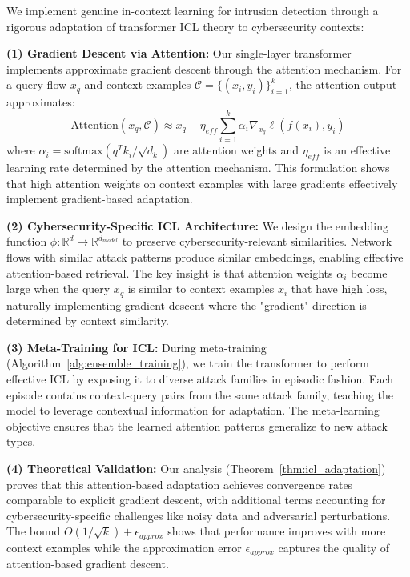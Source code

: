 \documentclass[journal]{IEEEtran}
\begin{document}
We implement genuine in-context learning for intrusion detection through a rigorous adaptation of transformer ICL theory to cybersecurity contexts:

\textbf{(1) Gradient Descent via Attention:} Our single-layer transformer implements approximate gradient descent through the attention mechanism. For a query flow $x_q$ and context examples $\mathcal{C} = \{(x_i, y_i)\}_{i=1}^k$, the attention output approximates:
\begin{equation}
\text{Attention}(x_q, \mathcal{C}) \approx x_q - \eta_{eff} \sum_{i=1}^k \alpha_i \nabla_{x_q} \ell(f(x_i), y_i)
\end{equation}
where $\alpha_i = \text{softmax}(q^T k_i / \sqrt{d_k})$ are attention weights and $\eta_{eff}$ is an effective learning rate determined by the attention mechanism. This formulation shows that high attention weights on context examples with large gradients effectively implement gradient-based adaptation.

\textbf{(2) Cybersecurity-Specific ICL Architecture:} We design the embedding function $\phi: \mathbb{R}^d \rightarrow \mathbb{R}^{d_{model}}$ to preserve cybersecurity-relevant similarities. Network flows with similar attack patterns produce similar embeddings, enabling effective attention-based retrieval. The key insight is that attention weights $\alpha_i$ become large when the query $x_q$ is similar to context examples $x_i$ that have high loss, naturally implementing gradient descent where the "gradient" direction is determined by context similarity.

\textbf{(3) Meta-Training for ICL:} During meta-training (Algorithm~\ref{alg:ensemble_training}), we train the transformer to perform effective ICL by exposing it to diverse attack families in episodic fashion. Each episode contains context-query pairs from the same attack family, teaching the model to leverage contextual information for adaptation. The meta-learning objective ensures that the learned attention patterns generalize to new attack types.

\textbf{(4) Theoretical Validation:} Our analysis (Theorem~\ref{thm:icl_adaptation}) proves that this attention-based adaptation achieves convergence rates comparable to explicit gradient descent, with additional terms accounting for cybersecurity-specific challenges like noisy data and adversarial perturbations. The bound $O(1/\sqrt{k}) + \epsilon_{approx}$ shows that performance improves with more context examples while the approximation error $\epsilon_{approx}$ captures the quality of attention-based gradient descent.
\end{document}
